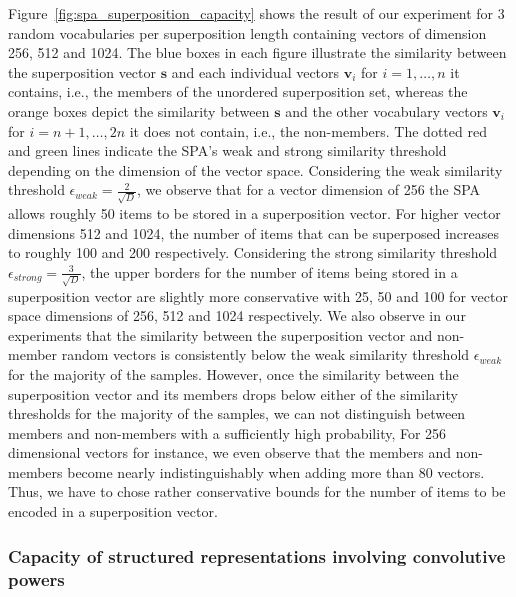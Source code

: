 Figure~\ref{fig:spa_superposition_capacity} shows the result of our experiment for \num{3} random vocabularies per superposition length containing vectors of dimension \num{256}, \num{512} and \num{1024}.
The blue boxes in each figure illustrate the similarity between the superposition vector $ \mathbf{s}$ and each individual vectors $ \mathbf{v}_i$ for $i=1, \ldots, n$ it contains, i.e., the members of the unordered superposition set, whereas the orange boxes depict the similarity between $ \mathbf{s}$ and the other vocabulary vectors $ \mathbf{v}_i$ for $i=n+1, \ldots, 2n$ it does not contain, i.e., the non-members.
The dotted red and green lines indicate the \ac{SPA}'s weak and strong similarity threshold depending on the dimension of the vector space.
Considering the weak similarity threshold $\epsilon_{weak} = \tfrac{2}{\sqrt{D}}$, we observe that for a vector dimension of \num{256} the \ac{SPA} allows roughly \num{50} items to be stored in a superposition vector.
For higher vector dimensions \num{512} and \num{1024}, the number of items that can be superposed increases to roughly \num{100} and \num{200} respectively.
Considering the strong similarity threshold $\epsilon_{strong} = \tfrac{3}{\sqrt{D}}$, the upper borders for the number of items being stored in a superposition vector are slightly more conservative with \num{25}, \num{50} and \num{100} for vector space dimensions of \num{256}, \num{512} and \num{1024} respectively.
We also observe in our experiments that the similarity between the superposition vector and non-member random vectors is consistently below the weak similarity threshold $\epsilon_{weak}$ for the majority of the samples.
However, once the similarity between the superposition vector and its members drops below either of the similarity thresholds for the majority of the samples, we can not distinguish between members and non-members with a sufficiently high probability,
For \num{256} dimensional vectors for instance, we even observe that the members and non-members become nearly indistinguishably when adding more than \num{80} vectors.
Thus, we have to chose rather conservative bounds for the number of items to be encoded in a superposition vector.

\subsubsection{Capacity of structured representations involving convolutive powers}%
\label{ssubsec:capacity_of_structured_representations_involving_convolutive_powers}

